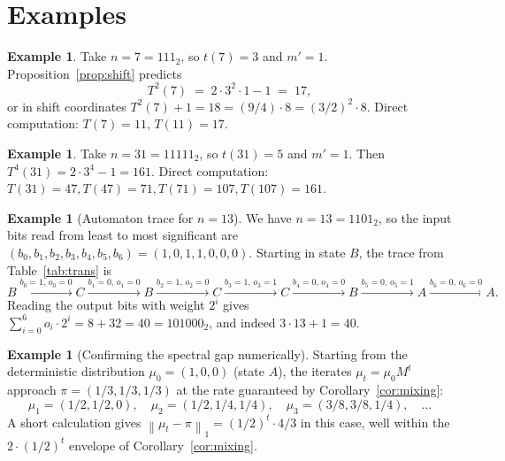 \documentclass[11pt,a4paper]{article}
\theoremstyle{definition}
\newtheorem{example}[theorem]{Example}
\theoremstyle{remark}
\newcommand{\norm}[1]{\left\|#1\right\|}
\begin{document}
\section{Examples}\label{sec:examples}

\begin{example}\label{ex:n7}
Take $n = 7 = 111_2$, so $t(7) = 3$ and $m' = 1$.
Proposition~\ref{prop:shift} predicts
\[
  T^2(7) \;=\; 2 \cdot 3^2 \cdot 1 - 1 \;=\; 17,
\]
or in shift coordinates $T^2(7) + 1 = 18 = (9/4) \cdot 8 = (3/2)^2
\cdot 8$.  Direct computation: $T(7) = 11$, $T(11) = 17$. \checkmark
\end{example}

\begin{example}
Take $n = 31 = 11111_2$, so $t(31) = 5$ and $m' = 1$.  Then
$T^4(31) = 2 \cdot 3^4 - 1 = 161$.  Direct computation: $T(31) = 47,
T(47) = 71, T(71) = 107, T(107) = 161$. \checkmark
\end{example}

\begin{example}[Automaton trace for $n = 13$]\label{ex:n13}
We have $n = 13 = 1101_2$, so the input bits read from least to most
significant are $(b_0, b_1, b_2, b_3, b_4, b_5, b_6) = (1, 0, 1, 1, 0,
0, 0)$.  Starting in state $B$, the trace from Table~\ref{tab:trans} is
\[
  B \xrightarrow{b_0=1,\, o_0=0} C
    \xrightarrow{b_1=0,\, o_1=0} B
    \xrightarrow{b_2=1,\, o_2=0} C
    \xrightarrow{b_3=1,\, o_3=1} C
    \xrightarrow{b_4=0,\, o_4=0} B
    \xrightarrow{b_5=0,\, o_5=1} A
    \xrightarrow{b_6=0,\, o_6=0} A.
\]
Reading the output bits with weight $2^i$ gives
$\sum_{i=0}^{6} o_i \cdot 2^i = 8 + 32 = 40 = 101000_2$, and indeed
$3 \cdot 13 + 1 = 40$. \checkmark
\end{example}

\begin{example}[Confirming the spectral gap numerically]
Starting from the deterministic distribution $\mu_0 = (1, 0, 0)$ (state
$A$), the iterates $\mu_t = \mu_0 M^t$ approach $\pi = (1/3, 1/3, 1/3)$
at the rate guaranteed by Corollary~\ref{cor:mixing}:
\[
  \mu_1 = (1/2, 1/2, 0), \quad
  \mu_2 = (1/2, 1/4, 1/4), \quad
  \mu_3 = (3/8, 3/8, 1/4), \quad \dots
\]
A short calculation gives
$\norm{\mu_t - \pi}_1 = (1/2)^t \cdot 4/3$ in this case, well within the
$2 \cdot (1/2)^t$ envelope of Corollary~\ref{cor:mixing}.
\end{example}
\end{document}
